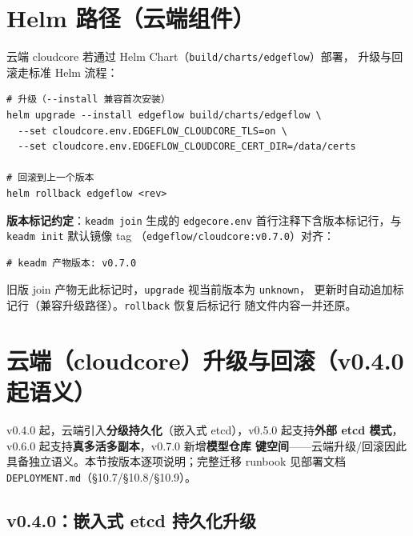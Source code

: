 \section{Helm 路径（云端组件）}

云端 cloudcore 若通过 Helm Chart（\texttt{build/charts/edgeflow}）部署，
升级与回滚走标准 Helm 流程：

\begin{lstlisting}
# 升级（--install 兼容首次安装）
helm upgrade --install edgeflow build/charts/edgeflow \
  --set cloudcore.env.EDGEFLOW_CLOUDCORE_TLS=on \
  --set cloudcore.env.EDGEFLOW_CLOUDCORE_CERT_DIR=/data/certs

# 回滚到上一个版本
helm rollback edgeflow <rev>
\end{lstlisting}

\textbf{版本标记约定}：\texttt{keadm join} 生成的 \texttt{edgecore.env}
首行注释下含版本标记行，与 \texttt{keadm init} 默认镜像 tag
（\texttt{edgeflow/cloudcore:v0.7.0}）对齐：

\begin{lstlisting}
# keadm 产物版本: v0.7.0
\end{lstlisting}

旧版 join 产物无此标记时，\texttt{upgrade} 视当前版本为 \texttt{unknown}，
更新时自动追加标记行（兼容升级路径）。\texttt{rollback} 恢复后标记行
随文件内容一并还原。

\section{云端（cloudcore）升级与回滚（v0.4.0 起语义）}
\label{sec:7-cloud}

v0.4.0 起，云端引入\textbf{分级持久化}（嵌入式 etcd），v0.5.0 起支持\textbf{外部
etcd 模式}，v0.6.0 起支持\textbf{真多活多副本}，v0.7.0 新增\textbf{模型仓库
键空间}——云端升级/回滚因此具备独立语义。本节按版本逐项说明；完整迁移
runbook 见部署文档 \texttt{DEPLOYMENT.md}（§10.7/§10.8/§10.9）。

\subsection{v0.4.0：嵌入式 etcd 持久化升级}

